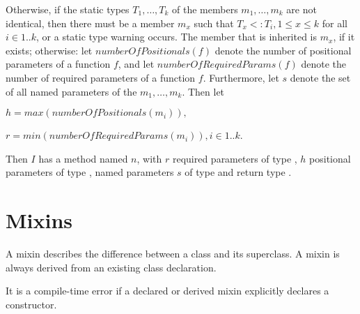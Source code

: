 \documentclass{article}
\begin{document}
\LMHash{}
Otherwise, if the static types $T_1, \ldots,  T_k$ of the members $m_1, \ldots,  m_k$  are not identical, then there must be a member $m_x$ such that $T_x <: T_i, 1 \le x \le k$ for all  $i  \in 1..k$, or a static type warning occurs. The member that is inherited  is $m_x$, if it exists; otherwise:
 let $numberOfPositionals(f)$ denote the number of positional parameters of a function $f$, and let $numberOfRequiredParams(f)$ denote the number of required parameters of a function $f$. Furthermore, let $s$ denote the set of all named parameters of the $m_1, \ldots,  m_k$.  Then let 

$h = max(numberOfPositionals(m_i)), $

$r = min(numberOfRequiredParams(m_i)), i \in 1..k$. 

\LMHash{}
Then $I$ has a method named $n$, with $r$ required parameters of type \DYNAMIC{}, $h$  positional parameters of type \DYNAMIC{}, named parameters $s$ of type  \DYNAMIC{} and  return type  \DYNAMIC{}.  






\section{Mixins}


\LMHash{}
A mixin describes the difference between a class and its superclass. A mixin is always derived from an existing class declaration. 

\LMHash{}
It is a compile-time error if a declared or derived mixin explicitly declares a constructor. 
\end{document}
